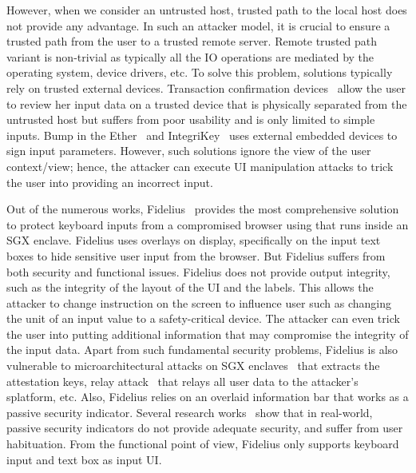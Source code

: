 However, when we consider an untrusted host, trusted path to the local host does not provide any advantage. In such an attacker model, it is crucial to ensure a trusted path from the user to a trusted remote server. Remote trusted path variant is non-trivial as typically all the IO operations are mediated by the operating system, device drivers, etc. To solve this problem, solutions typically rely on trusted external devices. Transaction confirmation devices~\cite{filyanov2011uni,weigold2011secure} allow the user to review her input data on a trusted device that is physically separated from the untrusted host but suffers from poor usability and is only limited to simple inputs. Bump in the Ether~\cite{McCPerRei2006} and IntegriKey~\cite{IntegriKey} uses external embedded devices to sign input parameters. However, such solutions ignore the view of the user context/view; hence, the attacker can execute UI manipulation attacks to trick the user into providing an incorrect input.

Out of the numerous works, Fidelius~\cite{Fidelius} provides the most comprehensive solution to protect keyboard inputs from a compromised browser using \js that runs inside an SGX enclave. Fidelius uses overlays on display, specifically on the input text boxes to hide sensitive user input from the browser. But Fidelius suffers from both security and functional issues. Fidelius does not provide output integrity, such as the integrity of the layout of the UI and the labels. This allows the attacker to change instruction on the screen to influence user such as changing the unit of an input value to a safety-critical device. The attacker can even trick the user into putting additional information that may compromise the integrity of the input data. Apart from such fundamental security problems, Fidelius is also vulnerable to  microarchitectural attacks on SGX enclaves~\cite{van2018foreshadow} that extracts the attestation keys, relay attack~\cite{dhar2018proximitee} that relays all user data to the attacker's splatform, etc.
Also, Fidelius relies on an overlaid information bar that works as a passive security indicator. Several research works~\cite{egelman2008you,sobey2008exploring} show that in real-world, passive security indicators do not provide adequate security, and suffer from user habituation. From the functional point of view, Fidelius only supports keyboard input and text box as input UI.
 
